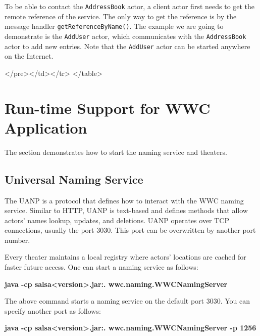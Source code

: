To be able to contact the {\tt AddressBook} actor, a client actor 
first needs to get the remote reference of the service. The only 
way to get the reference is by the message handler 
{\tt getReferenceByName()}. The example we are going to demonstrate is 
the {\tt AddUser} actor, which communicates with the {\tt AddressBook} actor 
to add new entries. Note that the {\tt AddUser} actor can be started anywhere on the Internet.
{\singlespace

}
\begin{htmlonly}

 \begin{rawhtml} 
   </pre></td></tr>
  </table>
\end{rawhtml} 
\end{htmlonly}

\section{Run-time Support for WWC Application}
\label{Run-time Support for WWC Application}
The section demonstrates how to start the naming service and theaters.

\subsection{Universal Naming Service}
The UANP is a protocol that defines how to interact with the WWC naming service. 
Similar to HTTP, UANP is text-based and defines methods that allow actors' names 
lookup, updates, and deletions. UANP operates over TCP connections, usually the port 3030. 
This port can be overwritten by another port number.

Every theater maintains a local registry where actors' locations are cached for faster 
future access. One can start a naming service as follows:

\textbf{java -cp salsa{\textless}version{\textgreater}.jar:. wwc.naming.WWCNamingServer}

The above command starts a naming service on the default port 3030. You can specify another 
port as follows:

\textbf{java -cp salsa{\textless}version{\textgreater}.jar:. wwc.naming.WWCNamingServer -p 1256}

